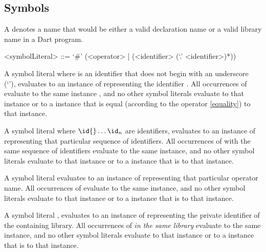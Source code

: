 \documentclass[makeidx]{article}
\begin{document}
{\subsection{Symbols}

\LMHash{}%
A 
denotes a name that would be either
a valid declaration name or a valid library name in a Dart program.

\begin{grammar}
<symbolLiteral> ::= `#' (<operator> | (<identifier> (`.' <identifier>)*))
\end{grammar}

\LMHash{}%
A symbol literal \code{\#\id} where \id{} is an identifier
that does not begin with an underscore (`\code{\_}'),
evaluates to an instance of  representing the identifier \id.
All occurrences of \code{\#\id} evaluate to the same instance
,
and no other symbol literals evaluate to that  instance
or to a  instance that is equal
(according to the \lit{==} operator \ref{equality}) to that instance.

\LMHash{}%
A symbol literal 
where $\id{} \ldots \id_n$ are identifiers,
evaluates to an instance of  representing that particular sequence of identifiers.
All occurrences of  with the same sequence of identifiers
evaluate to the same instance,
and no other symbol literals evaluate to that  instance
or to a  instance that is \lit{==} to that instance.

\LMHash{}%
A symbol literal  evaluates to an instance of 
representing that particular operator name.
All occurrences of  evaluate to the same instance,
and no other symbol literals evaluate to that  instance
or to a  instance that is \lit{==} to that instance.

\LMHash{}%
A symbol literal \code{\#\_\id}, evaluates to an instance of 
representing the private identifier \code{\_\id} of the containing library.
All occurrences of \code{\#\_\id} \emph{in the same library} evaluate to the same instance,
and no other symbol literals evaluate to that  instance
or to a  instance that is \lit{==} to that instance.

}
\end{document}
